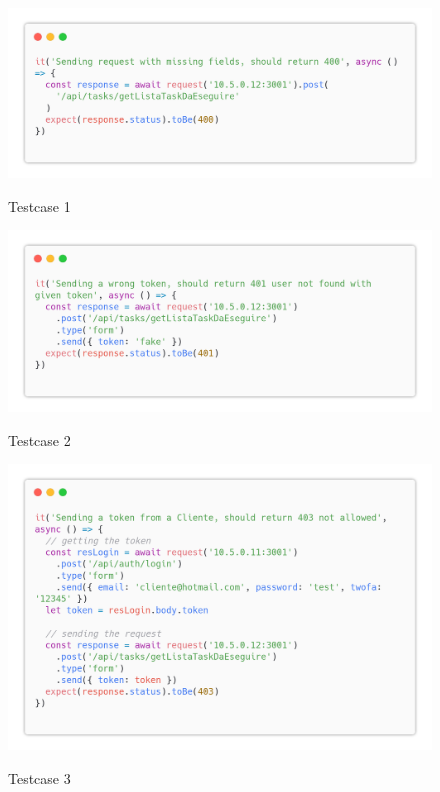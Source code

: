 \documentclass{report}
\begin{document}
\begin{figure}[H]
	\centering\includegraphics[width=1\textwidth]{images/code_da_eseguire_test1.png}

	Testcase 1
\end{figure}
\begin{figure}[H]
	\centering\includegraphics[width=1\textwidth]{images/code_da_eseguire_test2.png}

	Testcase 2
\end{figure}
\begin{figure}[H]
	\centering\includegraphics[width=1\textwidth]{images/code_da_eseguire_test3.png}

	Testcase 3
\end{figure}
\end{document}
